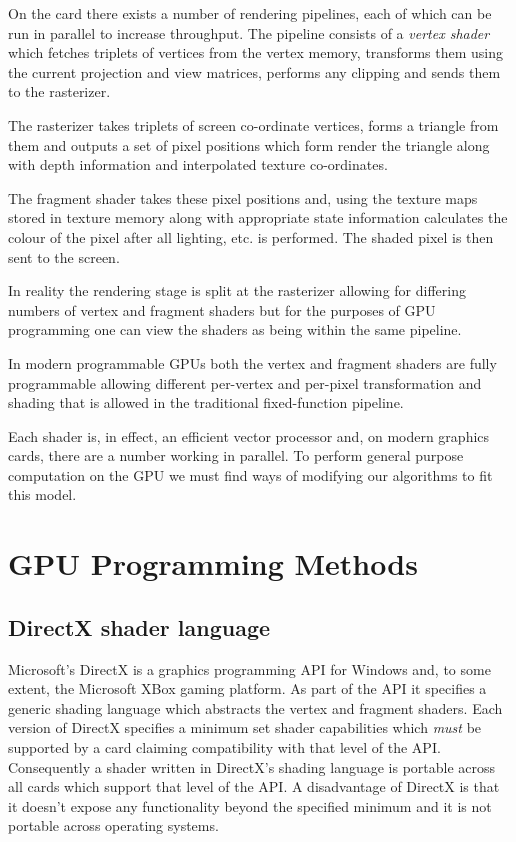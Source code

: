 On the card there exists a number of rendering pipelines, each of which
can be run in parallel to increase throughput. The pipeline consists
of a \emph{vertex shader} which fetches triplets of vertices from
the vertex memory, transforms them using the current projection and 
view matrices, performs any clipping and sends them to the rasterizer.

The rasterizer takes triplets of screen co-ordinate vertices, forms
a triangle from them and outputs a set of pixel positions which form
render the triangle along with depth information and interpolated texture
co-ordinates. 

The fragment shader takes these pixel positions and, using the texture maps
stored in texture memory along with appropriate state information calculates
the colour of the pixel after all lighting, etc. is performed. The shaded pixel
is then sent to the screen.

In reality the rendering stage is split at the rasterizer allowing for differing
numbers of vertex and fragment shaders but for the purposes of GPU programming
one can view the shaders as being within the same pipeline.

In modern programmable GPUs both the vertex and fragment shaders are fully 
programmable allowing different per-vertex and per-pixel transformation
and shading that is allowed in the traditional fixed-function pipeline.

Each shader is, in effect, an efficient vector processor and, on modern 
graphics cards, there are a number working in parallel. To perform
general purpose computation on the GPU we must find ways of modifying our
algorithms to fit this model.

\section{GPU Programming Methods}

\subsection{DirectX shader language}

Microsoft's DirectX\cite{GPU:DirectX} is a graphics programming API for
Windows and, to some extent, the Microsoft XBox gaming platform. As part of
the API it specifies a generic shading language\cite{GPU:DirectXShadingLanguage}
which abstracts the vertex and fragment shaders. Each version of DirectX
specifies a minimum set shader capabilities which \emph{must} be supported by a 
card claiming compatibility with that level of the API. Consequently a shader written in
DirectX's shading language is portable across all cards which support that level
of the API. A disadvantage of DirectX is that it doesn't expose any functionality
beyond the specified minimum and it is not portable across operating systems.

